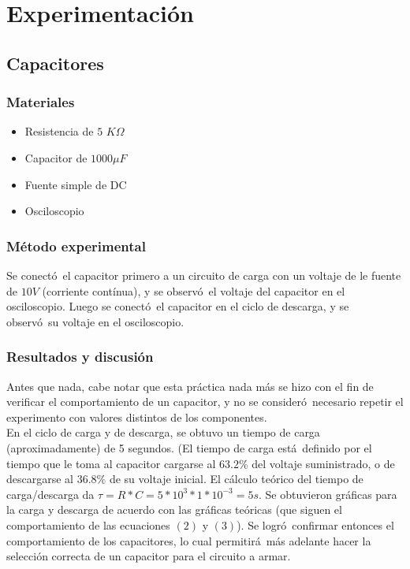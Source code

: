 \documentclass[11pt]{article}
\renewcommand{\=}[1]{\stackrel{#1}{=}} %
\theoremstyle{definition}
\theoremstyle{remark}
\begin{document}
\section{Experimentaci\'on}
\subsection{Capacitores}
\subsubsection{Materiales}
\begin{itemize}
\item Resistencia de $5$ $K\Omega$
\item Capacitor de $1000 \mu F$
\item Fuente simple de DC
\item Osciloscopio
\end{itemize}
\subsubsection{M\'etodo experimental}
Se conect\'o\ el capacitor primero a un circuito de carga con un voltaje de le fuente de $10V$ (corriente cont\'inua), y se observ\'o\ el voltaje del capacitor en el osciloscopio. Luego se conect\'o\ el capacitor en el ciclo de descarga, y se observ\'o\ su voltaje en el osciloscopio.

\subsubsection{Resultados y discusi\'on}
Antes que nada, cabe notar que esta pr\'actica nada m\'as se hizo con el fin de verificar el comportamiento de un capacitor, y no se consider\'o\ necesario repetir el experimento con valores distintos de los componentes. \\
En el ciclo de carga y de descarga, se obtuvo un tiempo de carga (aproximadamente) de 5 segundos. (El tiempo de carga est\'a\ definido por el tiempo que le toma al capacitor cargarse al $63.2\% $ del voltaje suministrado, o de descargarse al $36.8\% $ de su voltaje inicial. El c\'alculo te\'orico del tiempo de carga/descarga da $\tau=R*C=5*10^3*1*10^{-3}=	5s$. Se obtuvieron gr\'aficas para la carga y descarga de acuerdo con las gr\'aficas te\'oricas (que siguen el comportamiento de las ecuaciones $(2)$ y $(3)$). Se logr\'o\ confirmar entonces el comportamiento de los capacitores, lo cual permitir\'a\ m\'as adelante hacer la selecci\'on correcta de un capacitor para el circuito a armar.
\end{document}
